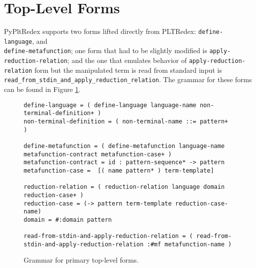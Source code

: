 \section{Top-Level Forms}

PyPltRedex supports two forms lifted directly from PLTRedex: \texttt{define-language}, and \\ \texttt{define-metafunction}; one form that had to be slightly modified is \texttt{apply-reduction-relation}; and the one that emulates behavior of \texttt{apply-reduction-relation} form but the manipulated term is read from standard input is \texttt{read\_from\_stdin\_and\_apply\_reduction\_relation}. The grammar for these forms can be found in Figure \ref{grammar-tlmain}.

\begin{figure}
\begin{verbatim}
define-language = ( define-language language-name non-terminal-definition+ )
non-terminal-definition = ( non-terminal-name ::= pattern+ )

define-metafunction = ( define-metafunction language-name metafunction-contract metafunction-case+ )
metafunction-contract =	id : pattern-sequence* -> pattern
metafunction-case =  [( name pattern* ) term-template]

reduction-relation = ( reduction-relation language domain reduction-case+ )
reduction-case = (-> pattern term-template reduction-case-name)
domain = #:domain pattern

read-from-stdin-and-apply-reduction-relation = ( read-from-stdin-and-apply-reduction-relation :#mf metafunction-name )
\end{verbatim}
\caption{Grammar for primary top-level forms.}
\label{grammar-tlmain}
\end{figure}

